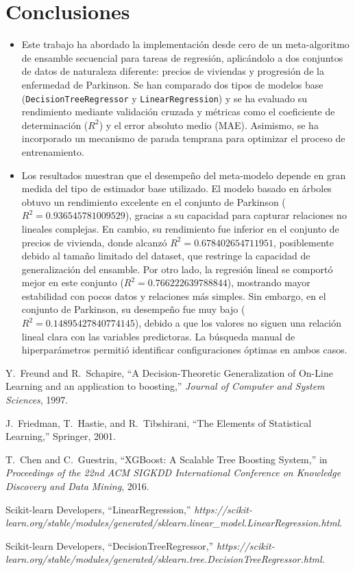 \documentclass[conference,a4paper]{IEEEtran}
\begin{document}
\section{Conclusiones}
\begin{itemize}
    
    \item Este trabajo ha abordado la implementación desde cero de un meta-algoritmo de ensamble secuencial para tareas de regresión, aplicándolo a dos conjuntos de datos de naturaleza diferente: precios de viviendas y progresión de la enfermedad de Parkinson. Se han comparado dos tipos de modelos base (\texttt{DecisionTreeRegressor} y \texttt{LinearRegression}) y se ha evaluado su rendimiento mediante validación cruzada y métricas como el coeficiente de determinación ($R^2$) y el error absoluto medio (MAE). Asimismo, se ha incorporado un mecanismo de parada temprana para optimizar el proceso de entrenamiento.

   \item Los resultados muestran que el desempeño del meta-modelo depende en gran medida del tipo de estimador base utilizado. El modelo basado en árboles obtuvo un rendimiento excelente en el conjunto de Parkinson ($R^2 = 0.936545781009529$), gracias a su capacidad para capturar relaciones no lineales complejas. En cambio, su rendimiento fue inferior en el conjunto de precios de vivienda, donde alcanzó $R^2 = 0.678402654711951$, posiblemente debido al tamaño limitado del dataset, que restringe la capacidad de generalización del ensamble. Por otro lado, la regresión lineal se comportó mejor en este conjunto ($R^2 = 0.766222639788844$), mostrando mayor estabilidad con pocos datos y relaciones más simples. Sin embargo, en el conjunto de Parkinson, su desempeño fue muy bajo ($R^2 = 0.14895427840774145$), debido a que los valores no siguen una relación lineal clara con las variables predictoras. La búsqueda manual de hiperparámetros permitió identificar configuraciones óptimas en ambos casos.

\end{itemize}

\begin{thebibliography}{1}
Y.~Freund and R.~Schapire, ``A Decision-Theoretic Generalization of On-Line Learning and an application to boosting,'' \emph{Journal of Computer and System Sciences}, 1997.

J.~Friedman, T.~Hastie, and R.~Tibshirani, ``The Elements of Statistical Learning,'' Springer, 2001.

T.~Chen and C.~Guestrin, ``XGBoost: A Scalable Tree Boosting System,'' in \emph{Proceedings of the 22nd ACM SIGKDD International Conference on Knowledge Discovery and Data Mining}, 2016.

Scikit-learn Developers, ``LinearRegression,'' \emph{https://scikit-learn.org/stable/modules/generated/sklearn.linear\_model.LinearRegression.html}.

Scikit-learn Developers, ``DecisionTreeRegressor,'' \emph{https://scikit-learn.org/stable/modules/generated/sklearn.tree.DecisionTreeRegressor.html}.
\end{thebibliography}
\end{document}
